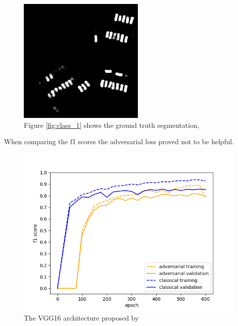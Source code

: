 \documentclass[a4paper,11pt]{article}
\begin{document}
\begin{figure}[H]
\endminipage\hfill
{}%
  \includegraphics[width=\linewidth]{gan_vs_class/gan_2}
\endminipage
\caption{Figure \ref{fig:class_1} shows the ground truth segmentation, }
\end{figure}
When comparing the f1 scores the adversarial loss proved not to be helpful.
\begin{center}
\begin{figure}[H]
      \includegraphics[scale=0.7]{classical_vs_adversarial}
  \caption{The VGG16 architecture proposed by \cite{simonyan_very_2014}} \label{fig:gan_vs_class}
\end{figure}
\end{center}
\end{document}
